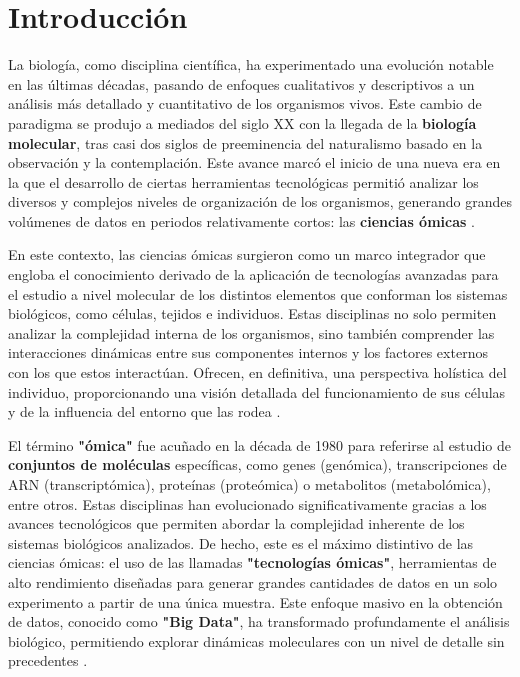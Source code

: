 \section{Introducción}

La biología, como disciplina científica, ha experimentado una evolución notable en las últimas décadas, 
pasando de enfoques cualitativos y descriptivos a un análisis más detallado y cuantitativo de los organismos 
vivos. Este cambio de paradigma se produjo a mediados del siglo XX con la llegada de la \textbf{biología molecular},
tras casi dos siglos de preeminencia del naturalismo basado en la observación y la contemplación. 
Este avance marcó el inicio de una nueva era en la que el desarrollo de ciertas herramientas tecnológicas permitió 
analizar los diversos y complejos niveles de organización de los organismos, generando grandes volúmenes de datos 
en periodos relativamente cortos: las \textbf{ciencias ómicas} \cite{referencia1}\cite{referencia2}. \newline

En este contexto, las ciencias ómicas surgieron como un marco integrador que engloba el conocimiento derivado 
de la aplicación de tecnologías avanzadas para el estudio a nivel molecular de los distintos elementos que 
conforman los sistemas biológicos, como células, tejidos e individuos. Estas disciplinas no solo permiten 
analizar la complejidad interna de los organismos, sino también comprender las interacciones dinámicas 
entre sus componentes internos y los factores externos con los que estos interactúan. Ofrecen, en definitiva,
una perspectiva holística del individuo, proporcionando una visión detallada del funcionamiento de sus células 
y de la influencia del entorno que las rodea \cite{referencia2}. \newline

El término \textbf{"ómica"} fue acuñado en la década de 1980 para referirse al estudio de 
\textbf{conjuntos de moléculas} específicas, como genes (genómica), transcripciones de ARN (transcriptómica), 
proteínas (proteómica) o metabolitos (metabolómica), entre otros. Estas disciplinas han evolucionado 
significativamente gracias a los avances tecnológicos que permiten abordar la complejidad inherente de los 
sistemas biológicos analizados. De hecho, este es el máximo distintivo de las ciencias ómicas: el uso de las 
llamadas \textbf{"tecnologías ómicas"}, herramientas de alto rendimiento diseñadas para generar grandes cantidades 
de datos en un solo experimento a partir de una única muestra. Este enfoque masivo en la obtención de datos, 
conocido como \textbf{"Big Data"}, ha transformado profundamente el análisis biológico, permitiendo explorar 
dinámicas moleculares con un nivel de detalle sin precedentes \cite{referencia2} \cite{referencia5}. \newline

